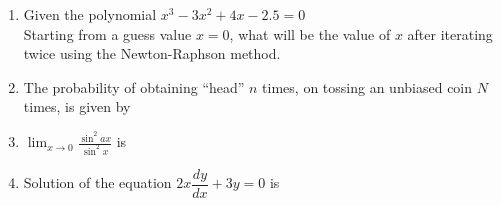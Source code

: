 \documentclass[journal,12pt,onecolumn]{IEEEtran}
\theoremstyle{remark}
\begin{document}
\begin{enumerate}
    \item Given the polynomial $x^3 - 3x^2 + 4x - 2.5 = 0$\\
    Starting from a guess value $x = 0$, what will be the value of $x$ after iterating twice using the Newton-Raphson method.
    \hfill{}
    \begin{enumerate}[label=(\Alph*)]
    \end{enumerate}

    \item The probability of obtaining ``head'' $n$ times, on tossing an unbiased coin $N$ times, is given by
    \hfill{}
    \begin{enumerate}[label=(\Alph*)]
    \end{enumerate}

    \item $\displaystyle \lim_{x \to 0} \frac{\sin^2 a x}{\sin^2 x}$ is
    \hfill{}
    \begin{enumerate}[label=(\Alph*)]
    \end{enumerate}
    



    \item Solution of the equation $2x \dfrac{dy}{dx} + 3y = 0$ is
    \hfill{}
    \begin{enumerate}[label=(\Alph*)]
    \end{enumerate}


\end{enumerate}
\end{document}
